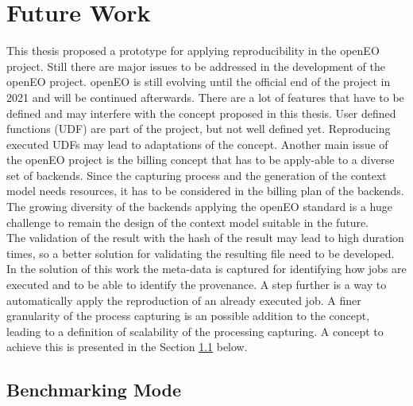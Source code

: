 \documentclass[draft,final]{vutinfth} %
\begin{document}
\section{Future Work}\label{FutureWork}
This thesis proposed a prototype for applying reproducibility in the openEO project. Still there are major issues to be addressed in the development of the openEO project. 
openEO is still evolving until the official end of the project in 2021 and will be continued afterwards. There are a lot of features that have to be defined and may interfere with the concept proposed in this thesis. User defined functions (UDF) are part of the project, but not well defined yet. Reproducing executed UDFs may lead to adaptations of the concept. Another main issue of the openEO project is the billing concept that has to be apply-able to a diverse set of backends. Since the capturing process and the generation of the context model needs resources, it has to be considered in the billing plan of the backends. The growing diversity of the backends applying the openEO standard is a huge challenge to remain the design of the context model suitable in the future. \\
The validation of the result with the hash of the result may lead to high duration times, so a better solution for validating the resulting file need to be developed.
In the solution of this work the meta-data is captured for identifying how jobs are executed and to be able to identify the provenance. A step further is a way to automatically apply the reproduction of an already executed job. A finer granularity of the process capturing is an possible addition to the concept, leading to a definition of scalability of the processing capturing. A concept to achieve this is presented in the Section \ref{Job:Benchmarking} below. 

\subsection{Benchmarking Mode}\label{Job:Benchmarking}
\end{document}
